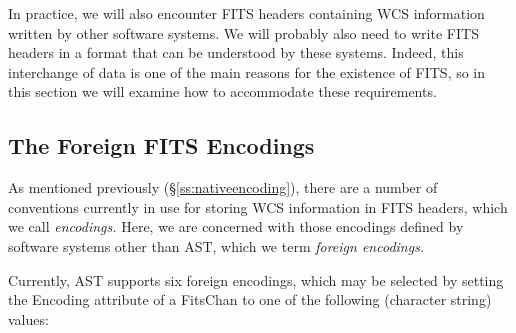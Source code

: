 \documentclass[twoside,11pt]{article}
\newcommand{\secref}[1]{\S\ref{#1}}
\newcommand{\secref}[1]{\ref{#1}}
\begin{document}
In practice, we will also encounter FITS headers containing WCS
information written by other software systems.  We will probably also
need to write FITS headers in a format that can be understood by these
systems. Indeed, this interchange of data is one of the main reasons
for the existence of FITS, so in this section we will examine how to
accommodate these requirements.

\subsection{\label{ss:foreignencodings}The Foreign FITS Encodings}

As mentioned previously (\secref{ss:nativeencoding}), there are a
number of conventions currently in use for storing WCS information in
FITS headers, which we call {\em{encodings.}} Here, we are concerned
with those encodings defined by software systems other than AST, which
we term {\em{foreign encodings.}}

Currently, AST supports six foreign encodings, which may be selected
by setting the Encoding attribute of a FitsChan to one of the
following (character string) values:
\end{document}
